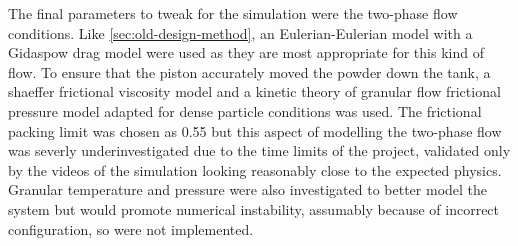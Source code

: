 The final parameters to tweak for the simulation were the two-phase flow conditions. Like \autoref{sec:old-design-method}, an Eulerian-Eulerian model with a Gidaspow drag model were used as they are most appropriate for this kind of flow. To ensure that the piston accurately moved the powder down the tank, a shaeffer frictional viscosity model and a kinetic theory of granular flow frictional pressure model adapted for dense particle conditions was used. The frictional packing limit was chosen as 0.55 but this aspect of modelling the two-phase flow was severly underinvestigated due to the time limits of the project, validated only by the videos of the simulation looking reasonably close to the expected physics. Granular temperature and pressure were also investigated to better model the system but would promote numerical instability, assumably because of incorrect configuration, so were not implemented.


















